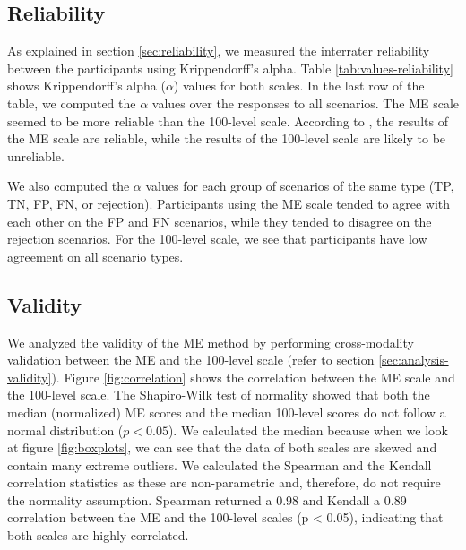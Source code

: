 \subsection{Reliability}
\label{sec:results-reliability}
As explained in section \ref{sec:reliability}, we measured the interrater reliability between the participants using Krippendorff's alpha.
%
Table \ref{tab:values-reliability} shows Krippendorff's alpha ($\alpha$) values for both scales.
%
In the last row of the table, we computed the $\alpha$ values over the responses to all scenarios.
%
The ME scale seemed to be more reliable than the 100-level scale.
%
According to \citet{krippendorff2004reliability}, the results of the ME scale are reliable, while the results of the 100-level scale are likely to be unreliable.
%

%
We also computed the $\alpha$ values for each group of scenarios of the same type (TP, TN, FP, FN, or rejection).
%
Participants using the ME scale tended to agree with each other on the FP and FN scenarios, while they tended to disagree on the rejection scenarios.
%
For the 100-level scale, we see that participants have low agreement on all scenario types.

\subsection{Validity}
\label{sec:results-validity}
We analyzed the validity of the ME method by performing cross-modality validation between the ME and the 100-level scale (refer to section \ref{sec:analysis-validity}).
%
Figure \ref{fig:correlation} shows the correlation between the ME scale and the 100-level scale.
%
The Shapiro-Wilk test of normality showed that both the median (normalized) ME scores and the median 100-level scores do not follow a normal distribution ($p < 0.05$).
%
We calculated the median because when we look at figure \ref{fig:boxplots}, we can see that the data of both scales are skewed and contain many extreme outliers.
% 
We calculated the Spearman and the Kendall correlation statistics as these are non-parametric and, therefore, do not require the normality assumption.
%
Spearman returned a 0.98 and Kendall a 0.89 correlation between the ME and the 100-level scales (p < 0.05), indicating that both scales are highly correlated.

